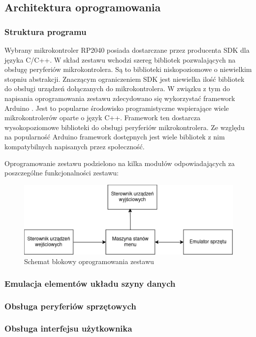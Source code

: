 \documentclass[../main.tex]{subfiles}
\begin{document}
\subsection{Architektura oprogramowania}

    \subsubsection{Struktura programu}

    Wybrany mikrokontroler RP2040 posiada dostarczane przez producenta SDK dla języka C/C++. W skład zestawu wchodzi szereg
    bibliotek pozwalających na obsługę peryferiów mikrokontrolera. Są to biblioteki niskopoziomowe o niewielkim stopniu abstrakcji.
    Znaczącym ograniczeniem SDK jest niewielka ilość bibliotek do obsługi urządzeń dołączanych do mikrokontrolera.
    W związku z tym do napisania oprogramowania zestawu zdecydowano się wykorzystać framework Arduino \cite{arduino_pico}. Jest to popularne środowisko 
    programistyczne wspierające wiele mikrokontrolerów oparte o język C++. Framework ten dostarcza wysokopoziomowe biblioteki do obsługi
    peryferiów mikrokontrolera. Ze względu na popularność Arduino framework dostępnych jest wiele bibliotek z nim kompatybilnych napisanych
    przez społeczność.
    \par
    Oprogramowanie zestawu podzielono na kilka modułów odpowiadających za poszczególne funkcjonalności zestawu:

    \begin{figure}[H]
        \centering
        \includegraphics[width=\linewidth]{software_diagram.png}
        \caption{Schemat blokowy oprogramowania zestawu}
        \label{fig:software_diagram}
    \end{figure}

    \subsubsection{Emulacja elementów układu szyny danych}

    \subsubsection{Obsługa peryferiów sprzętowych}

    \subsubsection{Obsługa interfejsu użytkownika}
\end{document}
